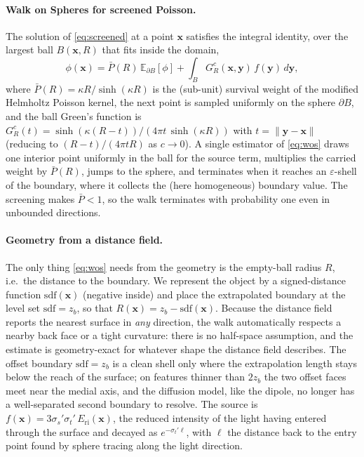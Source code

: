 \documentclass[11pt]{article}
\newcommand{\stp}{\sigma_t'}
\newcommand{\ssp}{\sigma_s'}
\begin{document}
\paragraph{Walk on Spheres for screened Poisson.}
The solution of \eqref{eq:screened} at a point $\mathbf{x}$ satisfies the
integral identity, over the largest ball $B(\mathbf{x},R)$ that fits inside the
domain,
\begin{equation}
  \phi(\mathbf{x}) = \bar P(R)\,\mathbb{E}_{\partial B}[\phi]
  + \int_{B} G^{c}_R(\mathbf{x},\mathbf{y})\,f(\mathbf{y})\,d\mathbf{y},
  \label{eq:wos}
\end{equation}
where $\bar P(R)=\kappa R/\sinh(\kappa R)$ is the (sub-unit) survival weight of
the modified Helmholtz Poisson kernel, the next point is sampled uniformly on the
sphere $\partial B$, and the ball Green's function is
$G^c_R(t)=\sinh(\kappa(R-t))/(4\pi t\,\sinh(\kappa R))$ with $t=\|\mathbf{y}-\mathbf{x}\|$
(reducing to $(R-t)/(4\pi tR)$ as $c\!\to\!0$). A single estimator of
\eqref{eq:wos} draws one interior point uniformly in the ball for the source
term, multiplies the carried weight by $\bar P(R)$, jumps to the sphere, and
terminates when it reaches an $\varepsilon$-shell of the boundary, where it
collects the (here homogeneous) boundary value. The screening makes $\bar P<1$,
so the walk terminates with probability one even in unbounded directions.

\paragraph{Geometry from a distance field.}
The only thing \eqref{eq:wos} needs from the geometry is the empty-ball radius
$R$, i.e.\ the distance to the boundary. We represent the object by a
signed-distance function $\mathrm{sdf}(\mathbf{x})$ (negative inside) and place
the extrapolated boundary at the level set $\mathrm{sdf}=z_b$, so that
$R(\mathbf{x})=z_b-\mathrm{sdf}(\mathbf{x})$. Because the distance field reports
the nearest surface in \emph{any} direction, the walk automatically respects a
nearby back face or a tight curvature: there is no half-space assumption, and the
estimate is geometry-exact for whatever shape the distance field describes. The
offset boundary $\mathrm{sdf}=z_b$ is a clean shell only where the extrapolation
length stays below the reach of the surface; on features thinner than $2z_b$ the
two offset faces meet near the medial axis, and the diffusion model, like the
dipole, no longer has a well-separated second boundary to resolve. The
source is $f(\mathbf{x})=3\ssp\stp\,E_{\mathrm{ri}}(\mathbf{x})$, the reduced
intensity of the light having entered through the surface and decayed as
$e^{-\stp\ell}$, with $\ell$ the distance back to the entry point found by sphere
tracing along the light direction.
\end{document}
